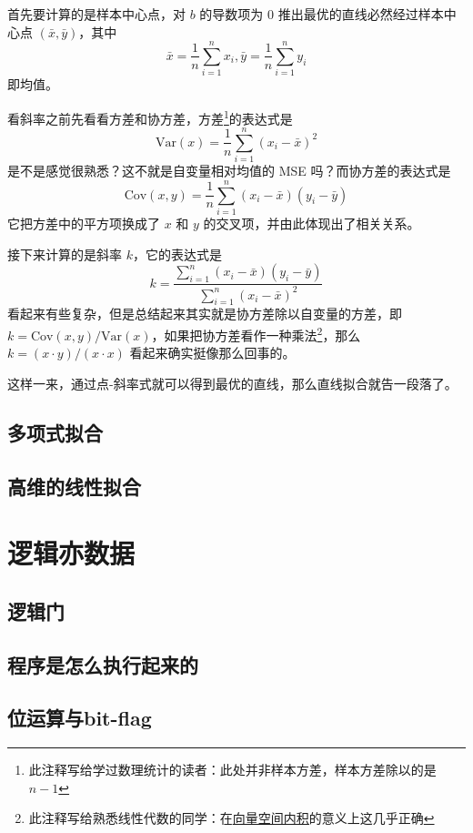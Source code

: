 \documentclass[UTF8, 12pt]{article}
\newcommand{\uhref}[2]{\href{#1}{\underline{#2}}}
\begin{document}
首先要计算的是样本中心点，对 $b$ 的导数项为 0 推出最优的直线必然经过样本中心点 $(\bar x, \bar y)$，其中
\[
    \bar x = \frac1n \sum_{i=1}^n x_i, \bar y = \frac1n \sum_{i=1}^n y_i
\]
即均值。

看斜率之前先看看方差和协方差，方差\footnote{此注释写给学过数理统计的读者：此处并非样本方差，样本方差除以的是 $n-1$}的表达式是
\[
    \text{Var}(x) = \frac1n \sum_{i=1}^n (x_i - \bar x)^2
\]
是不是感觉很熟悉？这不就是自变量相对均值的 MSE 吗？而协方差的表达式是
\[
    \text{Cov}(x, y) = \frac1n \sum_{i=1}^n (x_i - \bar x)(y_i - \bar y)
\]
它把方差中的平方项换成了 $x$ 和 $y$ 的交叉项，并由此体现出了相关关系。

接下来计算的是斜率 $k$，它的表达式是
\[
    k = \frac{\sum_{i=1}^n (x_i - \bar x)(y_i - \bar y)}{\sum_{i=1}^n (x_i - \bar x)^2}
\]
看起来有些复杂，但是总结起来其实就是协方差除以自变量的方差，即 $k = \text{Cov}(x, y) / \text{Var}(x)$，如果把协方差看作一种乘法\footnote{此注释写给熟悉线性代数的同学：在\uhref{https://en.wikipedia.org/wiki/Inner_product_space\#Random_variables}{向量空间内积}的意义上这几乎正确}，那么 $k = (x\cdot y) / (x\cdot x)$ 看起来确实挺像那么回事的。

这样一来，通过点-斜率式就可以得到最优的直线，那么直线拟合就告一段落了。

\vfill

\subsection{多项式拟合}
\subsection{高维的线性拟合}

\section{逻辑亦数据}
\subsection{逻辑门}
\subsection{程序是怎么执行起来的}
\subsection{位运算与bit-flag}
\end{document}
